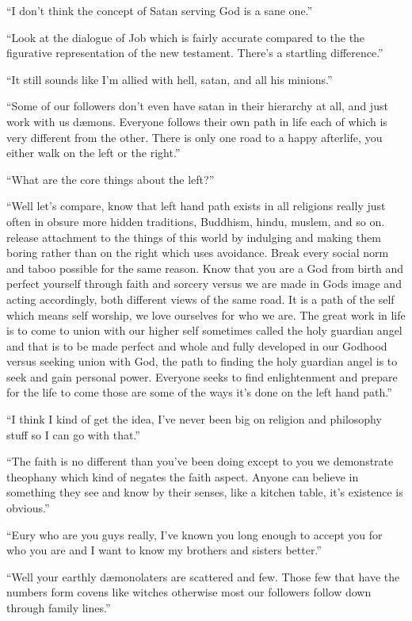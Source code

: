 ``I don't think the concept of Satan serving God is a sane one.''

``Look at the dialogue of Job which is fairly accurate compared to the the figurative representation of the new testament.  There's a startling difference.''

``It still sounds like I'm allied with hell, satan, and all his minions.''

``Some of our followers don't even have satan in their hierarchy at all, and just work with us d\ae mons. Everyone follows their own path in life each of which is very different from the other. There is only one road to a happy afterlife, you either walk on the left or the right.''

``What are the core things about the left?''

``Well let's compare, know that left hand path exists in all religions really just often in obsure more hidden traditions, Buddhism, hindu, muslem, and so on. release attachment to the things of this world by indulging and making them boring rather than on the right which uses avoidance. Break every social norm and taboo possible for the same reason. Know that you are a God from birth and perfect yourself through faith and sorcery versus we are made in Gods image and acting accordingly, both different views of the same road. It is a path of the self which means self worship, we love ourselves for who we are. The great work in life is to come to union with our higher self sometimes called the holy guardian angel and that is to be made perfect and whole and fully developed in our Godhood versus seeking union with God, the path to finding the holy guardian angel is to seek and gain personal power. Everyone seeks to find enlightenment and prepare for the life to come those are some of the ways it's done on the left hand path.''

``I think I kind of get the idea, I've never been big on religion and philosophy stuff so I can go with that.''

``The faith is no different than you've been doing except to you we demonstrate theophany which kind of negates the faith aspect. Anyone can believe in something they see and know by their senses, like a kitchen table, it's existence is obvious.''

``Eury who are you guys really, I've known you long enough to accept you for who you are and I want to know my brothers and sisters better.''

``Well your earthly d\ae monolaters are scattered and few. Those few that have the numbers form covens like witches otherwise most our followers follow down through family lines.''

